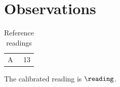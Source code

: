 \section{Observations}
\begin{table}
\caption{Reference readings}
\label{tab:reading}
\begin{tabular}{lr}A & 13\\\end{tabular}
\end{table}
The calibrated reading is $\reading$.
